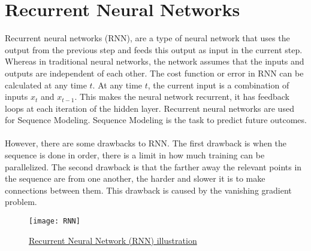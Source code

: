 \section{Recurrent Neural Networks}
Recurrent neural networks (RNN), are a type of neural network that uses the output from the previous step and feeds this output as input in the current step. Whereas in traditional neural networks, the network assumes that the inputs and outputs are independent of each other. The cost function or error in RNN can be calculated at any time $t$. At any time $t$, the current input is a combination of inputs $x_t$ and $x_{t-1}$. This makes the neural network recurrent, it has feedback loops at each iteration of the hidden layer. Recurrent neural networks are used for Sequence Modeling. Sequence Modeling is the task to predict future outcomes. \\\\
However, there are some drawbacks to RNN. The first drawback is when the sequence is done in order, there is a limit in how much training can be parallelized. The second drawback is that the farther away the relevant points in the sequence are from one another, the harder and slower it is to make connections between them. This drawback is caused by the vanishing gradient problem.\\

\begin{figure}[!htb]
    \texttt{[image: RNN]}
    \caption{\href{https://cdn-images-1.medium.com/max/1600/1*NKhwsOYNUT5xU7Pyf6Znhg.png}{Recurrent Neural Network (RNN) illustration} }
\end{figure}

